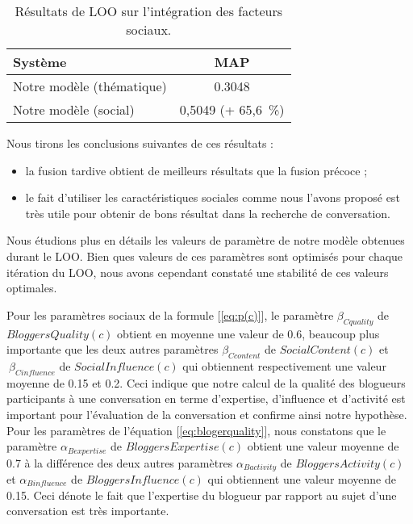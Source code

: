 \documentclass{article-hermes}
\begin{document}
\begin{table}[htb]
\center
\caption{\label{tab:soc} Résultats de LOO sur l'intégration des facteurs sociaux.}
\begin{tabular}{|l|c|}
   \hline
   Système & MAP  \\
   \hline
   Notre modèle (thématique)& 0.3048  \\
   \hline
   Notre modèle (social) & 0,5049 (+ 65,6~\%)\\
   \hline
\end{tabular}
\end{table}


\par Nous tirons les conclusions suivantes de ces résultats :
\begin{itemize}
\item la fusion tardive obtient de meilleurs résultats que la fusion précoce ;
\item le fait d'utiliser les caractéristiques sociales comme nous
l'avons proposé est très utile pour obtenir de bons résultat dans la
recherche de conversation.
\end{itemize}

\par Nous étudions plus en détails les valeurs de paramètre de notre modèle obtenues durant le LOO. Bien ques valeurs de ces paramètres sont optimisés pour chaque itération du LOO, nous avons cependant constaté une stabilité de ces valeurs optimales.
\par Pour les paramètres sociaux de la formule [\ref{eq:p(c)}], le paramètre $\beta_{Cquality}$ de $BloggersQuality(c)$ obtient en moyenne une valeur de 0.6, beaucoup plus importante que les deux autres paramètres $\beta_{Ccontent}$ de  $SocialContent(c)$ et $ ~\beta_{Cinfluence}$ de $SocialInfluence(c)$ qui obtiennent respectivement une valeur moyenne de 0.15 et 0.2. Ceci indique que notre calcul de la qualité des blogueurs participants à une conversation en terme d'expertise, d'influence et d'activité est important pour l'évaluation de la conversation et confirme ainsi notre hypothèse. Pour les paramètres de l'équation [\ref{eq:blogerquality}], nous constatons que le paramètre $\alpha_{Bexpertise}$ de $BloggersExpertise(c)$ obtient une valeur moyenne de 0.7 à la différence des deux autres paramètres   $\alpha_{Bactivity}$ de $BloggersActivity(c)$ et  $\alpha_{Binfluence}$ de $BloggersInfluence(c)$ qui obtiennent une valeur moyenne de 0.15. Ceci dénote le fait que l'expertise du blogueur par rapport au sujet d'une conversation est très importante.
 
\end{document}
